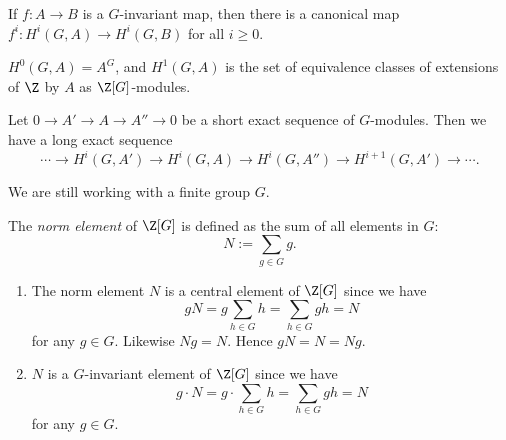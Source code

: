 \begin{corollary}
    If $f: A \to B$ is a $G$-invariant map, then there is a canonical map $f^i: H^i(G, A) \to H^i(G, B)$ for all $i \geq 0$.
\end{corollary}

\begin{corollary}
    $H^0(G, A) = A^G$, and $H^1(G, A)$ is the set of equivalence classes of extensions of $\Z$ by $A$ as $\Z[G]$-modules.    
\end{corollary}

\begin{corollary}
    Let $0 \to A' \to A \to A'' \to 0$ be a short exact sequence of $G$-modules.
    Then we have a long exact sequence
    \[
        \cdots \to H^i(G, A') \to H^i(G, A) \to H^i(G, A'') \to H^{i+1}(G, A') \to \cdots.
    \]
\end{corollary}

We are still working with a finite group $G$.
\begin{definition}
    The \textit{norm element} of $\Z[G]$ is defined as the sum of all elements in $G$:
    \[
        N := \sum_{g \in G} g.
    \]
\end{definition}

\begin{remark}
    \noindent\begin{enumerate}
        \item The norm element $N$ is a central element of $\Z[G]$ since we have
        \[gN = g\sum_{h \in G} h = \sum_{h \in G} gh = N\]
        for any $g \in G$. Likewise $Ng = N$. Hence $gN = N = Ng$.
        \item $N$ is a $G$-invariant element of $\Z[G]$ since we have
        \[g \cdot N = g \cdot \sum_{h \in G} h = \sum_{h \in G} gh = N\]
        for any $g \in G$.
    \end{enumerate}
\end{remark}

